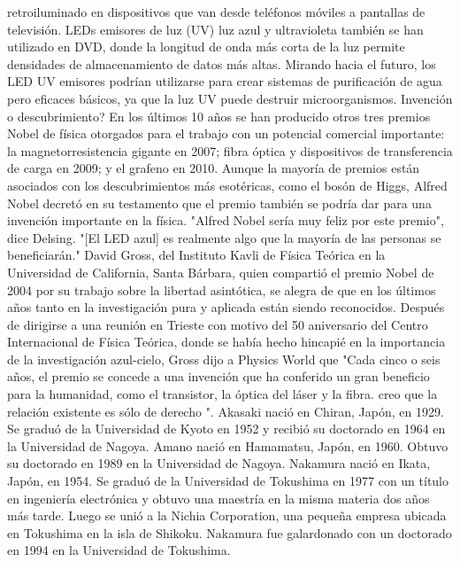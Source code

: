 retroiluminado en dispositivos que van desde teléfonos móviles a
pantallas de televisión. LEDs emisores de luz (UV) luz azul y
ultravioleta también se han utilizado en DVD, donde la longitud de
onda más corta de la luz permite densidades de almacenamiento de datos
más altas. Mirando hacia el futuro, los LED UV emisores podrían
utilizarse para crear sistemas de purificación de agua pero eficaces
básicos, ya que la luz UV puede destruir microorganismos.  Invención o
descubrimiento?  En los últimos 10 años se han producido otros tres
premios Nobel de física otorgados para el trabajo con un potencial
comercial importante: la magnetorresistencia gigante en 2007; fibra
óptica y dispositivos de transferencia de carga en 2009; y el grafeno
en 2010. Aunque la mayoría de premios están asociados con los
descubrimientos más esotéricas, como el bosón de Higgs, Alfred Nobel
decretó en su testamento que el premio también se podría dar para una
invención importante en la física.  "Alfred Nobel sería muy feliz por
este premio", dice Delsing. "[El LED azul] es realmente algo que la
mayoría de las personas se beneficiarán."  David Gross, del Instituto
Kavli de Física Teórica en la Universidad de California, Santa
Bárbara, quien compartió el premio Nobel de 2004 por su trabajo sobre
la libertad asintótica, se alegra de que en los últimos años tanto en
la investigación pura y aplicada están siendo reconocidos. Después de
dirigirse a una reunión en Trieste con motivo del 50 aniversario del
Centro Internacional de Física Teórica, donde se había hecho hincapié
en la importancia de la investigación azul-cielo, Gross dijo a Physics
World que "Cada cinco o seis años, el premio se concede a una
invención que ha conferido un gran beneficio para la humanidad, como
el transistor, la óptica del láser y la fibra. creo que la relación
existente es sólo de derecho ".  Akasaki nació en Chiran, Japón, en
1929. Se graduó de la Universidad de Kyoto en 1952 y recibió su
doctorado en 1964 en la Universidad de Nagoya.  Amano nació en
Hamamatsu, Japón, en 1960. Obtuvo su doctorado en 1989 en la
Universidad de Nagoya.  Nakamura nació en Ikata, Japón, en 1954. Se
graduó de la Universidad de Tokushima en 1977 con un título en
ingeniería electrónica y obtuvo una maestría en la misma materia dos
años más tarde. Luego se unió a la Nichia Corporation, una pequeña
empresa ubicada en Tokushima en la isla de Shikoku. Nakamura fue
galardonado con un doctorado en 1994 en la Universidad de Tokushima.


\newpage




